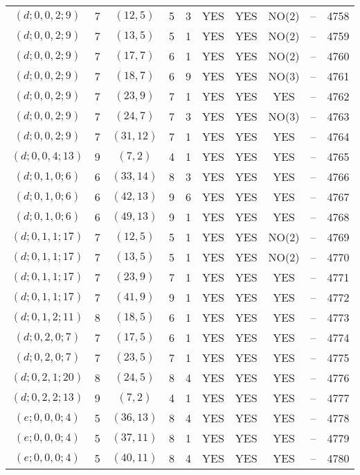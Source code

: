 \begin{longtable}{|c|c|c|c|c|c|c|c|c|c|}
$(d; 0, 0, 2; 9)$ & 7 & $(12, 5)$ & 5 & 3 & YES & YES & NO(2) & -- & 4758\\
$(d; 0, 0, 2; 9)$ & 7 & $(13, 5)$ & 5 & 1 & YES & YES & NO(2) & -- & 4759\\
$(d; 0, 0, 2; 9)$ & 7 & $(17, 7)$ & 6 & 1 & YES & YES & NO(2) & -- & 4760\\
$(d; 0, 0, 2; 9)$ & 7 & $(18, 7)$ & 6 & 9 & YES & YES & NO(3) & -- & 4761\\
$(d; 0, 0, 2; 9)$ & 7 & $(23, 9)$ & 7 & 1 & YES & YES & YES & -- & 4762\\
$(d; 0, 0, 2; 9)$ & 7 & $(24, 7)$ & 7 & 3 & YES & YES & NO(3) & -- & 4763\\
$(d; 0, 0, 2; 9)$ & 7 & $(31, 12)$ & 7 & 1 & YES & YES & YES & -- & 4764\\
$(d; 0, 0, 4; 13)$ & 9 & $(7, 2)$ & 4 & 1 & YES & YES & YES & -- & 4765\\
$(d; 0, 1, 0; 6)$ & 6 & $(33, 14)$ & 8 & 3 & YES & YES & YES & -- & 4766\\
$(d; 0, 1, 0; 6)$ & 6 & $(42, 13)$ & 9 & 6 & YES & YES & YES & -- & 4767\\
$(d; 0, 1, 0; 6)$ & 6 & $(49, 13)$ & 9 & 1 & YES & YES & YES & -- & 4768\\
$(d; 0, 1, 1; 17)$ & 7 & $(12, 5)$ & 5 & 1 & YES & YES & NO(2) & -- & 4769\\
$(d; 0, 1, 1; 17)$ & 7 & $(13, 5)$ & 5 & 1 & YES & YES & NO(2) & -- & 4770\\
$(d; 0, 1, 1; 17)$ & 7 & $(23, 9)$ & 7 & 1 & YES & YES & YES & -- & 4771\\
$(d; 0, 1, 1; 17)$ & 7 & $(41, 9)$ & 9 & 1 & YES & YES & YES & -- & 4772\\
$(d; 0, 1, 2; 11)$ & 8 & $(18, 5)$ & 6 & 1 & YES & YES & YES & -- & 4773\\
$(d; 0, 2, 0; 7)$ & 7 & $(17, 5)$ & 6 & 1 & YES & YES & YES & -- & 4774\\
$(d; 0, 2, 0; 7)$ & 7 & $(23, 5)$ & 7 & 1 & YES & YES & YES & -- & 4775\\
$(d; 0, 2, 1; 20)$ & 8 & $(24, 5)$ & 8 & 4 & YES & YES & YES & -- & 4776\\
$(d; 0, 2, 2; 13)$ & 9 & $(7, 2)$ & 4 & 1 & YES & YES & YES & -- & 4777\\
$(e; 0, 0, 0; 4)$ & 5 & $(36, 13)$ & 8 & 4 & YES & YES & YES & -- & 4778\\
$(e; 0, 0, 0; 4)$ & 5 & $(37, 11)$ & 8 & 1 & YES & YES & YES & -- & 4779\\
$(e; 0, 0, 0; 4)$ & 5 & $(40, 11)$ & 8 & 4 & YES & YES & YES & -- & 4780\\

\end{longtable}
